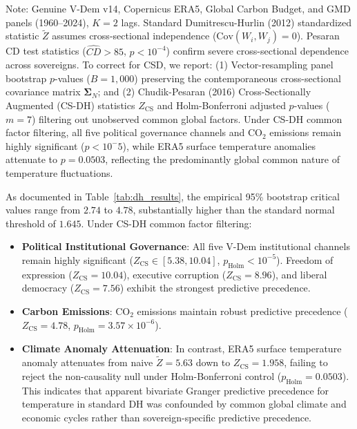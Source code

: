 \documentclass[11pt,a4paper]{article}
\begin{document}
\begin{table}[ht]
\begin{flushleft}
\footnotesize Note: Genuine V-Dem v14, Copernicus ERA5, Global Carbon Budget, and GMD panels (1960--2024), $K=2$ lags. Standard Dumitrescu-Hurlin (2012) standardized statistic $\tilde{Z}$ assumes cross-sectional independence ($\text{Cov}(W_i, W_j)=0$). Pesaran CD test statistics ($\hat{CD} > 85$, $p < 10^{-4}$) confirm severe cross-sectional dependence across sovereigns. To correct for CSD, we report: (1) Vector-resampling panel bootstrap $p$-values ($B=1,000$) preserving the contemporaneous cross-sectional covariance matrix $\boldsymbol{\Sigma}_N$; and (2) Chudik-Pesaran (2016) Cross-Sectionally Augmented (CS-DH) statistics $Z_{\text{CS}}$ and Holm-Bonferroni adjusted $p$-values ($m=7$) filtering out unobserved common global factors. Under CS-DH common factor filtering, all five political governance channels and CO$_2$ emissions remain highly significant ($p < 10^-5$), while ERA5 surface temperature anomalies attenuate to $p = 0.0503$, reflecting the predominantly global common nature of temperature fluctuations.
\end{flushleft}
\end{table}

As documented in Table~\ref{tab:dh_results}, the empirical 95\% bootstrap critical values range from $2.74$ to $4.78$, substantially higher than the standard normal threshold of $1.645$. Under CS-DH common factor filtering:
\begin{itemize}[leftmargin=*]
    \item \textbf{Political Institutional Governance}: All five V-Dem institutional channels remain highly significant ($Z_{\text{CS}} \in [5.38, 10.04]$, $p_{\text{Holm}} < 10^{-5}$). Freedom of expression ($Z_{\text{CS}} = 10.04$), executive corruption ($Z_{\text{CS}} = 8.96$), and liberal democracy ($Z_{\text{CS}} = 7.56$) exhibit the strongest predictive precedence.
    \item \textbf{Carbon Emissions}: $\text{CO}_2$ emissions maintain robust predictive precedence ($Z_{\text{CS}} = 4.78$, $p_{\text{Holm}} = 3.57 \times 10^{-6}$).
    \item \textbf{Climate Anomaly Attenuation}: In contrast, ERA5 surface temperature anomaly attenuates from naive $\tilde{Z} = 5.63$ down to $Z_{\text{CS}} = 1.958$, failing to reject the non-causality null under Holm-Bonferroni control ($p_{\text{Holm}} = 0.0503$). This indicates that apparent bivariate Granger predictive precedence for temperature in standard DH was confounded by common global climate and economic cycles rather than sovereign-specific predictive precedence.
\end{itemize}
\end{document}
